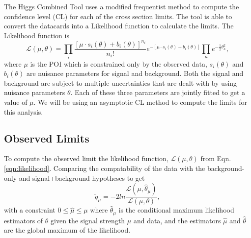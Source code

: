 The Higgs Combined Tool \cite{noauthor_procedure_2011} uses a modified frequentist method to compute the confidence level (CL) \cite{read_presentation_2002, junk_confidence_1999, read_modified_2000} for each of the cross section limits. The tool is able to convert the datacards into a Likelihood function to calculate the limits. The Likelihood function is 
\begin{equation}\label{eqn:likelihood}
\mathcal{L}(\mu,\theta)=\prod_i \frac{[\mu\cdot s_i(\theta)+b_i(\theta)]^{n_i}}{n_i !}e^{-[\mu\cdot s_i(\theta)+b_i(\theta)]}\prod_\kappa e^{-\frac{1}{2}\theta^2_\kappa},
\end{equation}
where $\mu$ is the POI which is constrained only by the observed data, $s_i(\theta)$ and $b_i(\theta)$ are nuisance parameters for signal and background. Both the signal and background are subject to multiple uncertainties that are dealt with by using nuisance parameters $\theta$. Each of these three parameters are jointly fitted to get a value of $\mu$. We will be using an asymptotic CL method to compute the limits for this analysis. 

\subsection{Observed Limits}\label{sec:ObsLimits}

To compute the observed limit the likelihood function, $\mathcal{L}(\mu,\theta)$ from Eqn. \ref{eqn:likelihood}. Comparing the compatability of the data with the background-only and signal+background hypotheses to get 
\begin{equation}
\widetilde{q}_\mu=-2 ln\frac{\mathcal{L}(\mu,\hat{\theta}_\mu)}{\mathcal{L}(\mu,\theta)},
\end{equation}
with a constraint $0\leq\hat{\mu}\leq\mu$ where $\hat{\theta}_\mu$ is the conditional maximum likelihood estimators of $\theta$ given the signal strength $\mu$ and data, and the estimators $\hat{\mu}$ and $\hat{\theta}$ are the global maximum of the likelihood. 

